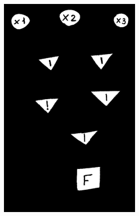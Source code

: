 \documentclass[makeidx, a4paper, 14pt]{extarticle}
\begin{document}
\begin{figure}[H]
    \includegraphics[width=70mm]{handwritten_1_masked.png}
\end{figure}
\end{document}
